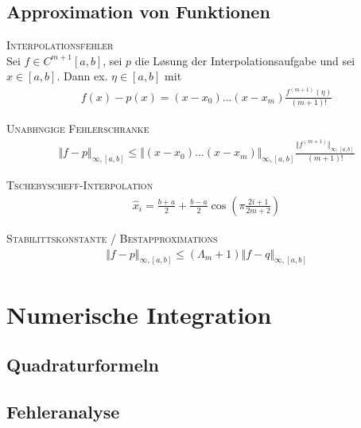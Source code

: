 \subsection{Approximation von Funktionen}
\textsc{Interpolationsfehler}\\
Sei $f\in C^{m+1}[a,b]$, sei $p$ die L\o sung der Interpolationsaufgabe und sei $x\in [a,b]$. Dann ex. $\eta \in [a,b]$ mit
\begin{align*}
f(x)-p(x) = (x-x_0)...(x-x_m)\frac{f^{(m+1)}(\eta)}{(m+1)!}
\end{align*}

\textsc{Unabh\a ngige Fehlerschranke}\\
\begin{align*}
\Vert f-p \Vert_{\infty,[a,b]} \leq \Vert (x - x_0 )...(x - x_m ) \Vert_{\infty,[a,b]} \frac{\Vert f^{(m+1)} \Vert_{\infty,[a,b]}}{(m+1)!}
\end{align*}

\textsc{Tschebyscheff-Interpolation}\\
\begin{align*}
\hat{x}_i = \frac{b+a}{2} + \frac{b-a}{2} \cos \left( \pi \frac{2i+1}{2m+2}\right)
\end{align*}

\textsc{Stabilit\a tskonstante / Bestapproximations}\\
\begin{align*}
\Vert f-p \Vert_{\infty,[a,b]} \leq (\Lambda_m + 1) \Vert f-q \Vert_{\infty,[a,b]} 
\end{align*}

\section{Numerische Integration}
\subsection{Quadraturformeln}
\subsection{Fehleranalyse}
\clearpage